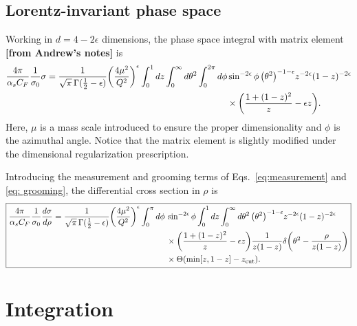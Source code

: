 \documentclass[11pt,twoside,reqno]{amsart}
\theoremstyle{plain}
\theoremstyle{remark}
\theoremstyle{definition}
\theoremstyle{remark}
\theoremstyle{definition}
\theoremstyle{definition}
\newcommand{\zcut}{z_\mathrm{cut}}
\begin{document}
\subsection{Lorentz-invariant phase space}

	Working in $d = 4 - 2\epsilon$ dimensions, the phase space integral with matrix element {\color{red}\textbf{[from Andrew's notes]}} is
	\begin{equation}
	\begin{aligned}
		\frac{4\pi}{\alpha_s C_F}\frac{1}{\sigma_0} \sigma = \frac{1}{\sqrt{\pi} \, \Gamma(\frac{1}{2} - \epsilon)} \qty(\frac{4 \mu^2}{Q^2})^\epsilon \int_0^1 dz \int_0^\infty d\theta^2 \int_0^{2\pi} d\phi &\sin^{-2\epsilon}\phi \, \qty(\theta^2)^{-1 - \epsilon} z^{-2\epsilon} (1 - z)^{-2\epsilon} \\
			&\times \qty(\frac{1 + (1 - z)^2}{z} - \epsilon z).
	\end{aligned}
	\end{equation}
	Here, $\mu$ is a mass scale introduced to ensure the proper dimensionality and $\phi$ is the azimuthal angle. Notice that the matrix element is slightly modified under the dimensional regularization prescription.

	Introducing the measurement and grooming terms of Eqs.\ \ref{eq:measurement} and \ref{eq: grooming}, the differential cross section in $\rho$ is
	\begin{equation}\label{eq:cross section integral}
	\boxed{
	\begin{aligned}
		\frac{4\pi}{\alpha_s C_F}\frac{1}{\sigma_0} \frac{d\sigma}{d\rho} = \frac{1}{\sqrt{\pi} \, \Gamma(\frac{1}{2} - \epsilon)} \qty(\frac{4 \mu^2}{Q^2})^\epsilon \int_0^{\pi} d\phi\, & \sin^{-2\epsilon}\phi \int_0^1 dz \int_0^\infty d\theta^2  \, \qty(\theta^2)^{-1 - \epsilon} z^{-2\epsilon} (1 - z)^{-2\epsilon} \\
			&\times \qty(\frac{1 + (1 - z)^2}{z} - \epsilon z) \frac{1}{z(1 - z)}\delta\qty(\theta^2 - \frac{\rho}{z(1 - z)})\\
			&\times \Theta(\min[z, 1 - z] - \zcut).
	\end{aligned}
	}
	\end{equation}


\section{Integration}
\end{document}
